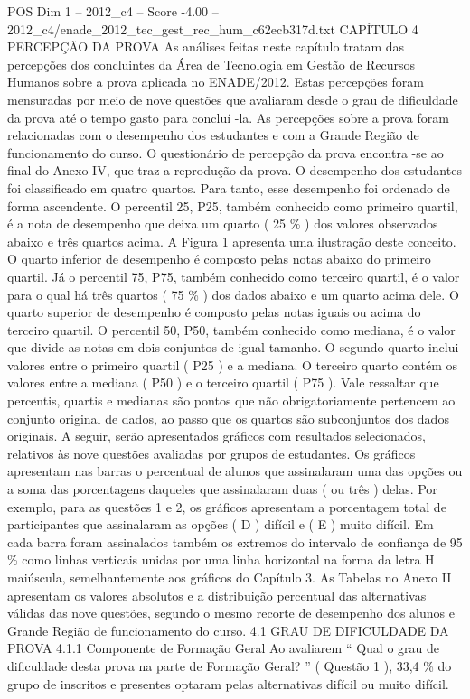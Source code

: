 \begin{textsample}{POS Dim 1 – 2012\_c4 – Score -4.00 – 2012\_c4/enade\_2012\_tec\_gest\_rec\_hum\_c62ecb317d.txt}  \label{ex:f1_pos_361}
CAPÍTULO 4 PERCEPÇÃO DA PROVA As análises feitas neste capítulo tratam das percepções dos concluintes da Área de Tecnologia em Gestão de Recursos Humanos sobre a prova aplicada no ENADE/2012.
Estas percepções foram mensuradas por meio de nove questões que avaliaram desde o grau de dificuldade da prova até o tempo gasto para concluí -la.
As percepções sobre a prova foram relacionadas com o desempenho dos estudantes e com a Grande Região de funcionamento do curso.
O questionário de percepção da prova encontra -se ao final do Anexo IV, que traz a reprodução da prova.
O desempenho dos estudantes foi classificado em quatro quartos.
Para tanto, esse desempenho foi ordenado de forma ascendente.
O percentil 25, P25, também conhecido como primeiro quartil, é a nota de desempenho que deixa um quarto ( 25 \% ) dos valores observados abaixo e três quartos acima.
A Figura 1 apresenta uma ilustração deste conceito.
O quarto inferior de desempenho é composto pelas notas abaixo do primeiro quartil.
Já o percentil 75, P75, também conhecido como terceiro quartil, é o valor para o qual há três quartos ( 75 \% ) dos dados abaixo e um quarto acima dele.
O quarto superior de desempenho é composto pelas notas iguais ou acima do terceiro quartil.
O percentil 50, P50, também conhecido como mediana, é o valor que divide as notas em dois conjuntos de igual tamanho.
O segundo quarto inclui valores entre o primeiro quartil ( P25 ) e a mediana.
O terceiro quarto contém os valores entre a mediana ( P50 ) e o terceiro quartil ( P75 ).
Vale ressaltar que percentis, quartis e medianas são pontos que não obrigatoriamente pertencem ao conjunto original de dados, ao passo que os quartos são subconjuntos dos dados originais.
A seguir, serão apresentados gráficos com resultados selecionados, relativos às nove questões avaliadas por grupos de estudantes.
Os gráficos apresentam nas barras o percentual de alunos que assinalaram uma das opções ou a soma das porcentagens daqueles que assinalaram duas ( ou três ) delas.
Por exemplo, para as questões 1 e 2, os gráficos apresentam a porcentagem total de participantes que assinalaram as opções ( D ) difícil e ( E ) muito difícil.
Em cada barra foram assinalados também os extremos do intervalo de confiança de 95 \% como linhas verticais unidas por uma linha horizontal na forma da letra H maiúscula, semelhantemente aos gráficos do Capítulo 3.
As Tabelas no Anexo II apresentam os valores absolutos e a distribuição percentual das alternativas válidas das nove questões, segundo o mesmo recorte de desempenho dos alunos e Grande Região de funcionamento do curso. 4.1 GRAU DE DIFICULDADE DA PROVA 4.1.1 Componente de Formação Geral Ao avaliarem “ Qual o grau de dificuldade desta prova na parte de Formação Geral? ” ( Questão 1 ), 33,4 \% do grupo de inscritos e presentes optaram pelas alternativas difícil ou muito difícil.

\end{textsample}
